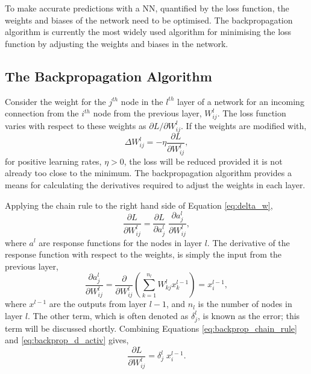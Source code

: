 To make accurate predictions with a NN, quantified by the loss function, the
weights and biases of the network need to be optimised. The backpropagation
algorithm\cite{Rumelhart1986} is currently the most widely used algorithm for
minimising the loss function by adjusting the weights and biases in the network.

\subsection{The Backpropagation Algorithm}

Consider the weight for the $j^{th}$ node in the $l^{th}$ layer of a network for
an incoming connection from the $i^{th}$ node from the previous layer, 
$W^l_{ij}$. The loss function varies with respect to these weights as 
$\partial L/\partial W^l_{ ij }$. If the weights are modified with, 
\begin{equation} 
	\Delta W^l_{ ij } = -\eta \frac{\partial L}{\partial W^l_{ ij }},
	\label{eq:delta_w}
\end{equation}
for positive learning rates, $\eta > 0$, the loss will be reduced provided it
is not already too close to the minimum. The backpropagation algorithm provides 
a means for calculating the derivatives required to adjust the weights in each 
layer.

Applying the chain rule to the right hand side of Equation \ref{eq:delta_w},
\begin{equation}
	\frac{\partial L}{\partial W^l_{ij}} = \frac{\partial L}{\partial a^l_j} \;
	\frac{\partial a^l_j}{\partial W^l_{ij}},
	\label{eq:backprop_chain_rule}
\end{equation}
where $a^l$ are response functions for the nodes in layer $l$. The derivative 
of the response function with respect to the weights, is simply the input from 
the previous layer,
\begin{equation}
	\frac{\partial a^l_j}{\partial W^l_{ij}} = \frac{\partial}{\partial W^l_{ij}}
	\left( \sum_{k = 1}^{n_l} W^l_{kj} x^{l-1}_{k} \right) = x^{l-1}_i,
	\label{eq:backprop_d_activ}
\end{equation}
where $x^{l-1}$ are the outputs from layer $l-1$, and $n_l$ is the number of 
nodes in layer $l$. The other term, which is often denoted as $\delta^l_j$, is 
known as the error; this term will be discussed shortly. Combining Equations 
\ref{eq:backprop_chain_rule} and \ref{eq:backprop_d_activ} gives,
\begin{equation*}
	\frac{\partial L}{\partial W^l_{ij}} = \delta^l_j \; x^{l-1}_i.
\end{equation*}

